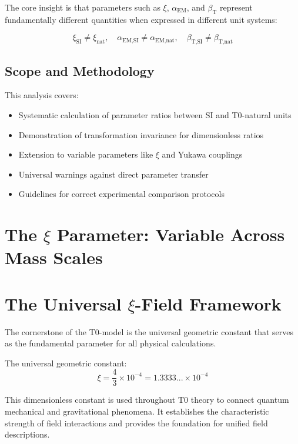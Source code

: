 \documentclass[12pt,a4paper]{article}
\newcommand{\xipar}{\xi}
\newcommand{\alphaEMSI}{\alpha_{\text{EM,SI}}}
\newcommand{\alphaEMnat}{\alpha_{\text{EM,nat}}}
\newcommand{\betaTSI}{\beta_{\text{T,SI}}}
\newcommand{\betaTnat}{\beta_{\text{T,nat}}}
\begin{document}
	The core insight is that parameters such as $\xipar$, $\alpha_{\text{EM}}$, and $\beta_{\text{T}}$ represent fundamentally different quantities when expressed in different unit systems:
	
	$$\xipar_{\text{SI}} \neq \xipar_{\text{nat}}, \quad \alphaEMSI \neq \alphaEMnat, \quad \betaTSI \neq \betaTnat$$
	
	\subsection{Scope and Methodology}
	\label{subsec:scope}
	
	This analysis covers:
	\begin{itemize}
		\item Systematic calculation of parameter ratios between SI and T0-natural units
		\item Demonstration of transformation invariance for dimensionless ratios
		\item Extension to variable parameters like $\xipar$ and Yukawa couplings
		\item Universal warnings against direct parameter transfer
		\item Guidelines for correct experimental comparison protocols
	\end{itemize}
	
	\section{The $\xipar$ Parameter: Variable Across Mass Scales}
	\label{sec:xi_parameter}
	\section{The Universal $\xi$-Field Framework}
	
	The cornerstone of the T0-model is the universal geometric constant that serves as the fundamental parameter for all physical calculations.
	

		The universal geometric constant:
		\begin{equation}
			\xi = \frac{4}{3} \times 10^{-4} = 1.3333... \times 10^{-4}
		\end{equation}

	
	This dimensionless constant is used throughout T0 theory to connect quantum mechanical and gravitational phenomena. It establishes the characteristic strength of field interactions and provides the foundation for unified field descriptions.
	
\end{document}
